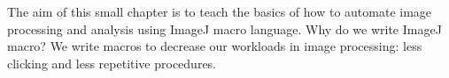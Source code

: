 
The aim of this small chapter is to teach the basics of how to automate image processing and analysis using ImageJ macro language. Why do we write ImageJ macro? We write macros to decrease our workloads in image processing: less clicking and less repetitive procedures. 
